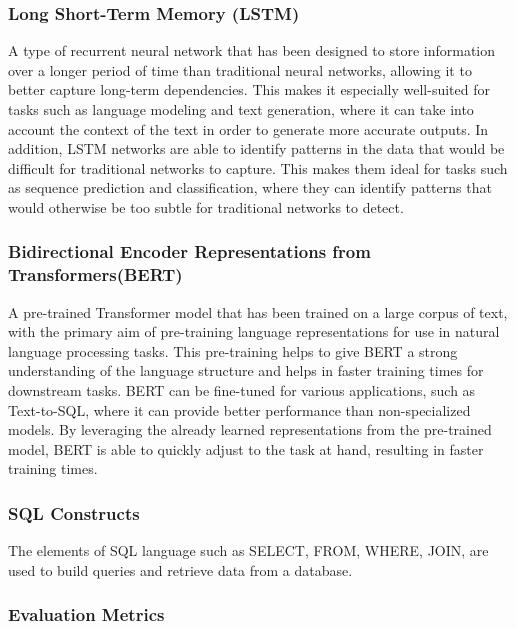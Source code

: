 \subsubsection{Long Short-Term Memory (LSTM)}

A type of recurrent neural network that has been designed to store information over a longer period of time than traditional neural networks, allowing it to better capture long-term dependencies\cite{Hochreiter1997LongSM}.
This makes it especially well-suited for tasks such as language modeling and text generation, where it can take into account the context of the text in order to generate more accurate outputs.
In addition, LSTM networks are able to identify patterns in the data that would be difficult for traditional networks to capture. This makes them ideal for tasks such as sequence prediction and classification, where they can identify patterns that would otherwise be too subtle for traditional networks to detect.

\subsubsection{Bidirectional Encoder Representations from Transformers(BERT)}

A pre-trained Transformer model that has been trained on a large corpus of text, with the primary aim of pre-training language representations for use in natural language processing tasks\cite{devlin-etal-2019-bert}. This pre-training helps to give BERT a strong understanding of the language structure and helps in faster training times for downstream tasks. BERT can be fine-tuned for various applications, such as Text-to-SQL, where it can provide better performance than non-specialized models. By leveraging the already learned representations from the pre-trained model, BERT is able to quickly adjust to the task at hand, resulting in faster training times.

\subsubsection{SQL Constructs}

The elements of SQL language such as SELECT, FROM, WHERE, JOIN, are used to build queries and retrieve data from a database.

\subsubsection{Evaluation Metrics}

